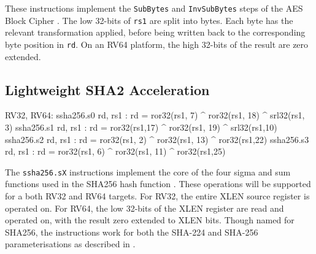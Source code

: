 These instructions implement the 
{\tt SubBytes} \cite[Section 5.1.1]{nist:fips:197}
and
{\tt InvSubBytes} \cite[Section 5.3.1]{nist:fips:197}
steps of the AES Block Cipher \cite{nist:fips:197}.
The low 32-bits of {\tt rs1} are split into bytes.
Each byte has the relevant transformation applied, before
being written back to the corresponding byte position in {\tt rd}.
On an RV64 platform, the high 32-bits of the result are zero
extended.





\subsection{Lightweight SHA2 Acceleration}

\begin{cryptoisa}
RV32, RV64:
    ssha256.s0 rd, rs1 : rd = ror32(rs1, 7) ^ ror32(rs1, 18) ^ srl32(rs1, 3)
    ssha256.s1 rd, rs1 : rd = ror32(rs1,17) ^ ror32(rs1, 19) ^ srl32(rs1,10)
    ssha256.s2 rd, rs1 : rd = ror32(rs1, 2) ^ ror32(rs1, 13) ^ ror32(rs1,22)
    ssha256.s3 rd, rs1 : rd = ror32(rs1, 6) ^ ror32(rs1, 11) ^ ror32(rs1,25)
\end{cryptoisa}

The {\tt ssha256.sX}
instructions implement the core of the four sigma and sum functions used in
the SHA256 hash function \cite[Section 4.1.2]{nist:fips:180:4}.
These operations will be supported for a both RV32 and RV64 targets.
For RV32, the entire XLEN source register is operated on.
For RV64, the low 32-bits of the XLEN register are read and operated on,
with the result zero extended to XLEN bits.
Though named for SHA256, the instructions work for both the
SHA-224 and SHA-256 parameterisations as described in
\cite{nist:fips:180:4}.


